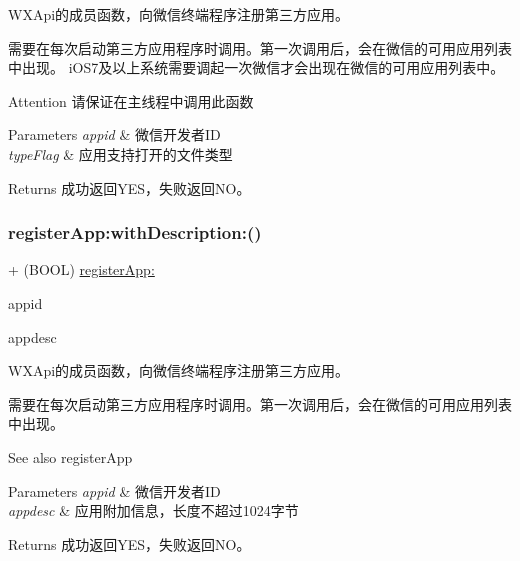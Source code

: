W\+X\+Api的成员函数，向微信终端程序注册第三方应用。 

需要在每次启动第三方应用程序时调用。第一次调用后，会在微信的可用应用列表中出现。 i\+O\+S7及以上系统需要调起一次微信才会出现在微信的可用应用列表中。 \begin{DoxyAttention}{Attention}
请保证在主线程中调用此函数 
\end{DoxyAttention}

\begin{DoxyParams}{Parameters}
{\em appid} & 微信开发者\+ID \\
\hline
{\em type\+Flag} & 应用支持打开的文件类型 \\
\hline
\end{DoxyParams}
\begin{DoxyReturn}{Returns}
成功返回\+Y\+E\+S，失败返回\+N\+O。 
\end{DoxyReturn}
\mbox{\label{interface_w_x_api_a76af46b7bb7e49aef40476a0dc377472}} 
\subsubsection{\texorpdfstring{register\+App\+:with\+Description\+:()}{registerApp:withDescription:()}\hspace{0.1cm}{\footnotesize\ttfamily [1/3]}}
{\footnotesize\ttfamily + (B\+O\+OL) \mbox{\hyperlink{interface_w_x_api_a84341d7a4aea16c2fd6e74708a569564}{register\+App\+:}} \begin{DoxyParamCaption}\item[{(N\+S\+String $\ast$)}]{appid }\item[{withDescription:(N\+S\+String $\ast$)}]{appdesc }\end{DoxyParamCaption}}



W\+X\+Api的成员函数，向微信终端程序注册第三方应用。 

需要在每次启动第三方应用程序时调用。第一次调用后，会在微信的可用应用列表中出现。 \begin{DoxySeeAlso}{See also}
register\+App 
\end{DoxySeeAlso}

\begin{DoxyParams}{Parameters}
{\em appid} & 微信开发者\+ID \\
\hline
{\em appdesc} & 应用附加信息，长度不超过1024字节 \\
\hline
\end{DoxyParams}
\begin{DoxyReturn}{Returns}
成功返回\+Y\+E\+S，失败返回\+N\+O。 
\end{DoxyReturn}
\mbox{\label{interface_w_x_api_a76af46b7bb7e49aef40476a0dc377472}} 
